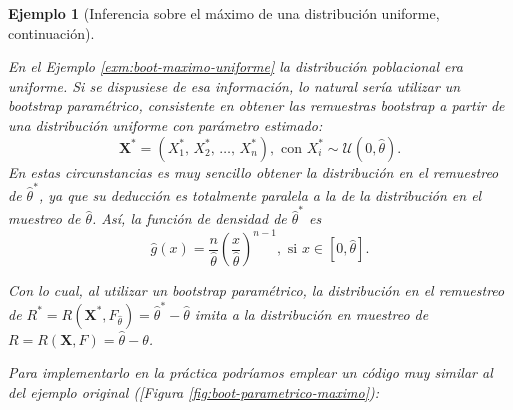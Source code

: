 \documentclass[
  spanish,
  10pt,
]{book}
\renewcommand{\mathbf}[1]{\symbf{#1}}
\theoremstyle{break}
\newtheorem{example}{Ejemplo}[chapter]
\theoremstyle{nonumberplain}
\begin{document}
\begin{example}[Inferencia sobre el máximo de una distribución uniforme, continuación]
\protect\hypertarget{exm:boot-maximo-parametrico}{}\label{exm:boot-maximo-parametrico}

En el Ejemplo \ref{exm:boot-maximo-uniforme} la distribución poblacional era uniforme.
Si se dispusiese de esa información, lo natural sería utilizar un bootstrap paramétrico,
consistente en obtener las remuestras bootstrap a partir de una distribución uniforme con parámetro estimado:
\[\mathbf{X}^{\ast}=\left( X_1^{\ast}\text{, }X_2^{\ast}\text{, 
}\ldots \text{, }X_n^{\ast} \right), \text{ con } X_i^{\ast} \sim \mathcal{U}\left( 0,\hat{\theta}\right).\]
En estas circunstancias es muy sencillo obtener la distribución en el
remuestreo de \(\hat{\theta}^{\ast}\), ya que su deducción es totalmente
paralela a la de la distribución en el muestreo de \(\hat{\theta}\). Así,
la función de densidad de \(\hat{\theta}^{\ast}\) es
\[\hat{g}\left( x \right) =\frac{n}{\hat{\theta}}\left( \frac{x}{\hat{\theta}}
 \right)^{n-1},\text{ si }x\in \left[ 0,\hat{\theta}\right] .\]

Con lo cual, al utilizar un bootstrap paramétrico, la distribución en el
remuestreo de \(R^{\ast}=R\left( \mathbf{X}^{\ast},F_{\hat{
\theta}} \right) =\hat{\theta}^{\ast}-\hat{\theta}\) imita a la
distribución en muestreo de
\(R=R\left( \mathbf{X},F \right) =\hat{\theta}-\theta\).

Para implementarlo en la práctica podríamos emplear un código muy similar al
del ejemplo original ({[}Figura \ref{fig:boot-parametrico-maximo}):


\end{example}
\end{document}

